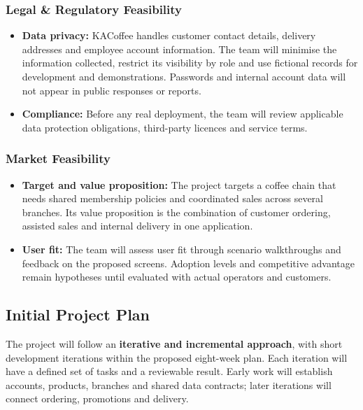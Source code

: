\subsubsection{Legal \& Regulatory Feasibility}

\begin{itemize}
  \item \textbf{Data privacy:} KACoffee handles customer contact details, delivery addresses and employee account information. The team will minimise the information collected, restrict its visibility by role and use fictional records for development and demonstrations. Passwords and internal account data will not appear in public responses or reports.
  \item \textbf{Compliance:} Before any real deployment, the team will review applicable data protection obligations, third-party licences and service terms.
\end{itemize}

\subsubsection{Market Feasibility}

\begin{itemize}
  \item \textbf{Target and value proposition:} The project targets a coffee chain that needs shared membership policies and coordinated sales across several branches. Its value proposition is the combination of customer ordering, assisted sales and internal delivery in one application.
  \item \textbf{User fit:} The team will assess user fit through scenario walkthroughs and feedback on the proposed screens. Adoption levels and competitive advantage remain hypotheses until evaluated with actual operators and customers.
\end{itemize}

\subsection{Initial Project Plan}

The project will follow an \textbf{iterative and incremental approach}, with short development iterations within the proposed eight-week plan. Each iteration will have a defined set of tasks and a reviewable result. Early work will establish accounts, products, branches and shared data contracts; later iterations will connect ordering, promotions and delivery.

